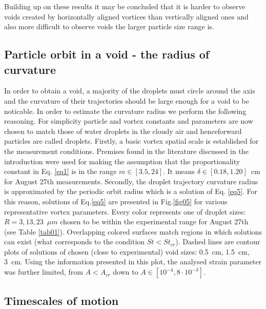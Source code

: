\documentclass[../main.tex]{subfiles}
\begin{document}
\noindent Building up on these results it may be concluded that it is harder to observe voids created by horizontally aligned vortices than vertically aligned ones and also more difficult to observe voids the larger particle size range is.\\

\subsection{Particle orbit in a void - the radius of curvature}
\label{ssec:par}
In order to obtain a void, a majority of the droplets must circle around the axis and the curvature of their trajectories should be large enough for a void to be noticable. In order to estimate the curvature radius we perform the following reasoning. For simplicity particle and vortex constants and parameters are now chosen to match those of water droplets in the cloudy air and henceforward particles are called droplets.
Firstly, a basic vortex spatial scale is established for the measurement conditions. Premises found in the literature discussed in the introduction were used for making the assumption that the proportionality constant in Eq. \ref{eq1} is in the range $m\in[3.5, 24]$. It means $\delta \in [0.18,1.20]$~cm for August 27th measurements.
Secondly, the droplet trajectory curvature radius is approximated by the periodic orbit radius which is a solution of Eq. \ref{eq5}. For this reason, solutions of Eq.\ref{eq5} are presented in Fig.\ref{fig05} for various representative vortex parameters. Every color represents one of droplet sizes: $R=3,13,23$~$\mu m$ chosen to be within the experimental range for August 27th (see Table \ref{tab01}). Overlapping colored surfaces match regions in which solutions can exist (what corresponds to the condition $St<St_{cr}$). Dashed lines are contour plots of solutions of chosen (close to experimental) void sizes: 0.5~cm, 1.5~cm, 3~cm. Using the information presented in this plot, the analysed strain parameter was further limited, from $A<A_{cr}$ down to $A \in [10^{-4}, 8\cdot10^{-3}]$.



\subsection{Timescales of motion}
\end{document}
